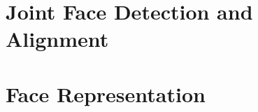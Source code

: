 \documentclass[class=report, crop=false, a4paper, 12pt]{standalone}
\begin{document}
\newpage
\section{Joint Face Detection and Alignment}
\section{Face Representation}
\end{document}
